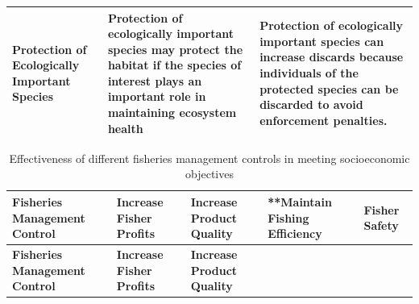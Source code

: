 \documentclass[]{book}
\begin{document}
\begin{longtable}[]{@{}lll@{}}
\begin{minipage}[t]{0.30\columnwidth}
Protection of Ecologically Important Species\strut
\end{minipage} & \begin{minipage}[t]{0.30\columnwidth}\raggedright\strut
Protection of ecologically important species may protect the habitat if
the species of interest plays an important role in maintaining ecosystem
health\strut
\end{minipage} & \begin{minipage}[t]{0.30\columnwidth}\raggedright\strut
Protection of ecologically important species can increase discards
because individuals of the protected species can be discarded to avoid
enforcement penalties.\strut
\end{minipage}\tabularnewline
\bottomrule
\end{longtable}

\begin{longtable}[]{@{}lllll@{}}
\caption{\label{tab:fmcs-social} Effectiveness of different fisheries
management controls in meeting socioeconomic objectives}\tabularnewline
\toprule
\begin{minipage}[b]{0.17\columnwidth}\raggedright\strut
\textbf{Fisheries Management Control}\strut
\end{minipage} & \begin{minipage}[b]{0.17\columnwidth}\raggedright\strut
\textbf{Increase Fisher Profits}\strut
\end{minipage} & \begin{minipage}[b]{0.17\columnwidth}\raggedright\strut
\textbf{Increase Product Quality}\strut
\end{minipage} & \begin{minipage}[b]{0.17\columnwidth}\raggedright\strut
**Maintain Fishing Efficiency\emph{ }\strut
\end{minipage} & \begin{minipage}[b]{0.17\columnwidth}\raggedright\strut
\textbf{Fisher Safety}\strut
\end{minipage}\tabularnewline
\midrule
\endfirsthead
\toprule
\begin{minipage}[b]{0.17\columnwidth}\raggedright\strut
\textbf{Fisheries Management Control}\strut
\end{minipage} & \begin{minipage}[b]{0.17\columnwidth}\raggedright\strut
\textbf{Increase Fisher Profits}\strut
\end{minipage} & \begin{minipage}[b]{0.17\columnwidth}\raggedright\strut
\textbf{Increase Product Quality}\strut

\end{minipage}
\end{longtable}
\end{document}
